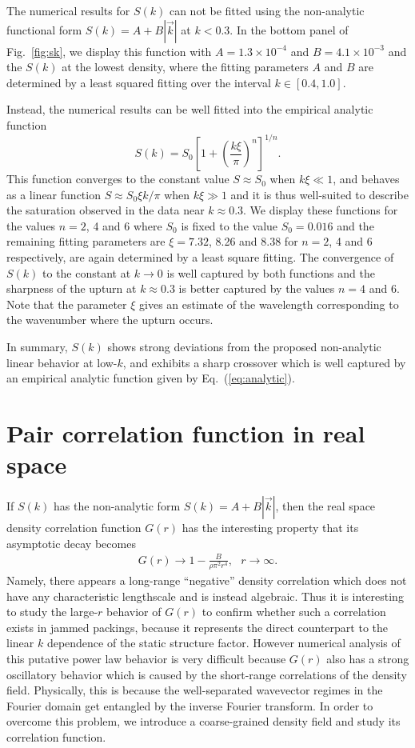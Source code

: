\documentclass[aps,pre,twocolumn,superscriptaddress]{revtex4-1}
\newcommand{\be}{\begin{equation}}
\newcommand{\ee}{\end{equation}}
\begin{document}
The numerical results for $S(k)$ can not be fitted using 
the non-analytic functional form $S(k) = A + B|\vec{k}|$ at $k < 0.3$. 
In the bottom panel of Fig.~\ref{fig:sk}, we display 
this function with $A = 1.3 \times 10^{-4}$ and $B = 4.1 \times 10^{-3}$
and the $S(k)$ at the lowest density, 
where the fitting parameters $A$ and $B$ are determined 
by a least squared fitting over the interval $k \in [0.4,1.0]$.
 
Instead, the numerical results can be well fitted into the 
empirical analytic function
\be
S(k) = S_0 \left[ 1 + \left( \frac{k \xi}{\pi}\right)^n \right]^{1/n}.
\label{eq:analytic}
\ee
This function converges to the constant value $S \approx S_0$ when 
$k \xi \ll 1$, and 
behaves as a linear function $S \approx S_0 \xi k/\pi$ when $k\xi \gg 1$
and it is thus well-suited to describe the saturation observed in the data
near $k \approx 0.3$.
We display these functions for the values $n=2$, 4 and 6
where $S_0$ is fixed to the value $S_0=0.016$ 
and the remaining fitting parameters are $\xi = 7.32$, 8.26 and 8.38 for 
$n=2$, 4 and 6 respectively, 
are again determined by a least square fitting. 
The convergence of $S(k)$ to the constant  at 
$k \to 0$ is well captured by both functions 
and the sharpness of the upturn at $k \approx 0.3$ is better captured by 
the values $n=4$ and 6. 
Note that the parameter $\xi$ gives an estimate of the wavelength 
corresponding to the wavenumber where the upturn occurs. 

In summary, $S(k)$ shows strong  deviations from the proposed 
non-analytic linear behavior at low-$k$, 
and exhibits a sharp crossover which is well
captured by an empirical analytic function given by Eq.~(\ref{eq:analytic}).

\section{Pair correlation function in real space}
\label{sec:gr}

If $S(k)$ has the non-analytic form $S(k) = A + B|\vec{k}|$, 
then the real space density correlation function $G(r)$ has the interesting 
property that its asymptotic decay becomes~\cite{donev2005} 
\begin{eqnarray}
G(r) \to 1 - \frac{B}{\rho \pi^2 r^4}, \ \ \  r \to \infty.
\end{eqnarray}
Namely, there appears a long-range ``negative'' density correlation 
which does not have any characteristic lengthscale
and is instead algebraic. 
Thus it is interesting to study the large-$r$ behavior of $G(r)$ 
to confirm whether such a correlation exists
in jammed packings, because it represents the direct 
counterpart to the linear $k$ dependence of the static structure factor. 
However numerical analysis of this putative 
power law behavior is very difficult 
because $G(r)$ also has a strong oscillatory behavior which is  
caused by the short-range correlations of the density field.
Physically, this is because the well-separated 
wavevector regimes in the Fourier domain get entangled by the inverse Fourier 
transform. In order to overcome this problem, 
we introduce a coarse-grained density field and study its correlation function.
\end{document}

